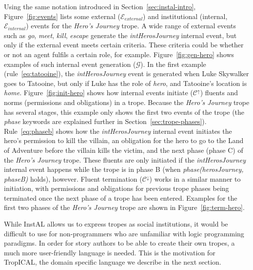 \documentclass[11pt]{report}
\begin{document}
Using the same notation introduced in Section~\ref{sec:instal-intro}, Figure~\ref{fig:events} lists some external ($\mathcal{E}_{external}$) and institutional (internal, $\mathcal{E}_{internal}$) events for the \emph{Hero's Journey} trope. A wide range of external events such as \emph{go}, \emph{meet}, \emph{kill}, \emph{escape} generate the \emph{intHerosJourney} internal event, but only if the external event meets certain criteria. These criteria could be whether or not an agent fulfils a certain role, for example. Figure~\ref{fig:gen-hero} shows examples of such internal event generation ($\mathcal{G}$). In the first example (rule~\ref{eq:tatooine}), the \emph{intHerosJourney} event is generated when Luke Skywalker goes to Tatooine, but only if Luke has the role of \emph{hero}, and Tatooine's location is \emph{home}.
Figure~\ref{fig:init-hero} shows how internal events initiate
($\mathcal{C^{\uparrow}}$) fluents and norms (permissions and obligations) in a
trope. Because the \emph{Hero's Journey} trope has several stages, this example
only shows the first two events of the trope (the \emph{phase} keywords are explained further in Section~\ref{sec:trope-phases}). Rule~\ref{eq:phaseb} shows how the \emph{intHerosJourney} internal event initiates the hero's permission to kill the villain, an obligation for the hero to go to the Land of Adventure before the villain kills the victim, and the next phase (phase C) of the \emph{Hero's Journey} trope. These fluents are only initiated if the \emph{intHerosJourney} internal event happens while the trope is in phase B (when \emph{phase(herosJourney, phaseB)} holds), however.
Fluent termination ($\mathcal{C^{\downarrow}}$) works in a similar manner to initiation, with permissions and obligations for previous trope phases being terminated once the next phase of a trope has been entered. Examples for the first two phases of the \emph{Hero's Journey} trope are shown in Figure~\ref{fig:term-hero}.

While InstAL allows us to express tropes as social institutions, it would be difficult to use for non-programmers who are unfamiliar with logic programming paradigms. In order for story authors to be able to create their own tropes, a much more user-friendly language is needed. This is the motivation for TropICAL, the domain specific language we describe in the next section.
\end{document}
